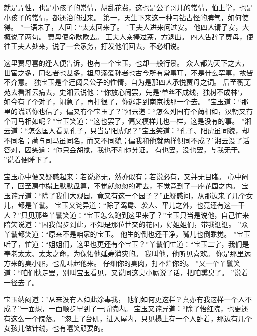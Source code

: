 就是弄性，也是小孩子的常情，胡乱花费，这也是公子哥儿的常情，怕上学，也是小孩子的常情，都还治的过来。
第一，天生下来这一种刁钻古怪的脾气，如何使得。
”一语未了，人回：“太太回来了。
”王夫人进来问过安。
他四人请了安，大概说了两句。
贾母便命歇歇去。
王夫人亲捧过茶，方退出。
四人告辞了贾母，便往王夫人处来，说了一会家务，打发他们回去，不必细说。
\par
这里贾母喜的逢人便告诉，也有一个宝玉，也却一般行景。
众人都为天下之大，世宦之多，同名者也甚多，祖母溺爱孙者也古今所有常事耳，不是什么罕事，故皆不介意。
独宝玉是个迂阔呆公子的性情，自为是那四人承悦贾母之词。
后至蘅芜苑去看湘云病去，史湘云说他：“你放心闹罢，先是‘单丝不成线，独树不成林’，如今有了个对子，闹急了，再打很了，你逃走到南京找那一个去。
”宝玉道：“那里的谎话你也信了，偏又有个宝玉了？”湘云道：“怎么列国有个蔺相如，汉朝又有个司马相如呢？”宝玉笑道：“这也罢了，偏又模样儿也一样，这是没有的事。
”湘云道：“怎么匡人看见孔子，只当是阳虎呢？”宝玉笑道：“孔子、阳虎虽同貌，却不同名；蔺与司马虽同名，而又不同貌；偏我和他就两样俱同不成？”湘云没了话答对，因笑道：“你只会胡搅，我也不和你分证。
有也罢，没也罢，与我无干。
”说着便睡下了。
\par
宝玉心中便又疑惑起来：若说必无，然亦似有；若说必有，又并无目睹。
心中闷了，回至房中榻上默默盘算，不觉就忽忽的睡去，不觉竟到了一座花园之内。
宝玉诧异道：“除了我们大观园，竟又有这一个园子？”正疑惑间，从那边来了几个女儿，都是丫鬟。
宝玉又诧异道：“除了鸳鸯、袭人、平儿之外，也竟还有这一干人？”只见那些丫鬟笑道：“宝玉怎么跑到这里来了？”宝玉只当是说他，自己忙来陪笑说道：“因我偶步到此，不知是那位世交的花园，好姐姐们，带我逛逛。
”众丫鬟都笑道：“原来不是咱家的宝玉。
他生的倒也还干净，嘴儿也倒乖觉。
”宝玉听了，忙道：“姐姐们，这里也更还有个宝玉？”丫鬟们忙道：“宝玉二字，我们是奉老太太、太太之命，为保佑他延寿消灾的。
我叫他，他听见喜欢。
你是那里远方来的臭小厮，也乱叫起他来。
仔细你的臭肉，打不烂你的。
”又一个丫鬟笑道：“咱们快走罢，别叫宝玉看见，又说同这臭小厮说了话，把咱熏臭了。
”说着一径去了。
\par
宝玉纳闷道：“从来没有人如此涂毒我，
他们如何更这样？真亦有我这样一个人不成？”一面想，一面顺步早到了一所院内。
宝玉又诧异道：“除了怡红院，也更还有这么一个院落。
”忽上了台矶，进入屋内，只见榻上有一个人卧着，那边有几个女孩儿做针线，也有嘻笑顽耍的。
